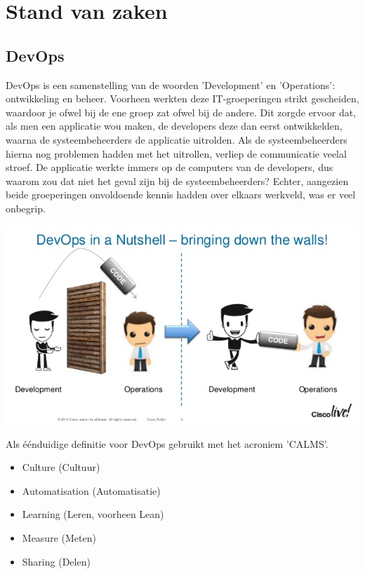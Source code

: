 \section{Stand van zaken}
\label{sec:stand-van-zaken}

\subsection{DevOps}
\label{sec:devops-uitleg}
DevOps is een samenstelling van de woorden ’Development’ en ’Operations’: ontwikkeling en beheer. Voorheen werkten deze IT-groeperingen strikt gescheiden, waardoor je ofwel bij de ene groep zat ofwel bij de andere. Dit zorgde ervoor dat, als men een applicatie wou maken, de developers deze dan eerst ontwikkelden, waarna de systeembeheerders de applicatie uitrolden. Als de systeembeheerders hierna nog problemen hadden met het uitrollen, verliep de communicatie veelal stroef. De applicatie werkte immers op de computers van de developers, dus waarom zou dat niet het geval zijn bij de systeembeheerders? Echter, aangezien beide groeperingen onvoldoende kennis hadden over elkaars werkveld, was er veel onbegrip.

\begin{center}
	\includegraphics[scale=0.5]{img/devopsmuur.jpg}
\end{center}

Als éénduidige definitie voor DevOps gebruikt met het acroniem 'CALMS'.
\begin{itemize}[noitemsep]
	\item Culture (Cultuur)
	\item Automatisation (Automatisatie)
	\item Learning (Leren, voorheen Lean)
	\item Measure (Meten)
	\item Sharing (Delen)
\end{itemize}

